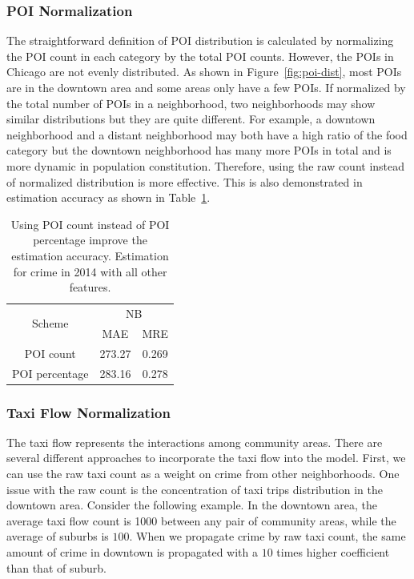 \subsubsection{POI Normalization}
The straightforward definition of POI distribution is calculated by normalizing the POI count in each category by the total POI counts. However, the POIs in Chicago are not evenly distributed. As shown in Figure~\ref{fig:poi-dist}, most POIs are in the downtown area and some areas only have a few POIs. If normalized by the total number of POIs in a neighborhood, two neighborhoods may show similar distributions but they are quite different. For example, a downtown neighborhood and a distant neighborhood may both have a high ratio of the food category but the downtown neighborhood has many more POIs in total and is more dynamic in population constitution. Therefore, using the raw count instead of normalized distribution is more effective. This is also demonstrated in estimation accuracy as shown in Table~\ref{tb:poi-norm}. 

\begin{table}[h]
\centering
\caption{Using POI count instead of POI percentage improve the estimation accuracy. Estimation for crime in 2014 with all other features.}
\vspace{2mm}
\label{tb:poi-norm}
\begin{tabular}{|c|c|c|}
\hline
\multirow{2}{*}{Scheme} & \multicolumn{2}{|c|}{NB} \\ \cline{2-3}
	& MAE & MRE \\ \hline
POI count & 273.27& 0.269  \\ \hline
POI percentage &283.16  & 0.278\\ \hline
\end{tabular}
\end{table}




\subsubsection{Taxi Flow Normalization}
The taxi flow represents the interactions among community areas. There are several different approaches to incorporate the taxi flow into the model.  First, we can use the raw taxi count as a weight on crime from other neighborhoods. One issue with the raw count is the concentration of taxi trips distribution in the downtown area. Consider the following example. In the downtown area, the average taxi flow count is \num{1000} between any pair of community areas, while the average of suburbs is $100$. When we propagate crime by raw taxi count, the same amount of crime in downtown is propagated with a  $10$ times higher coefficient than that of suburb. 


